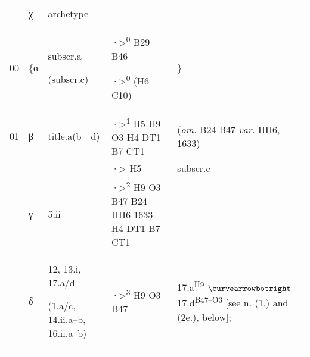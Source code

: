 \begin{paper}
\begin{center}
\begin{longtable}[]{@{}p{}p{}p{}p{}p{}@{}}
& χ & archetype & &\tabularnewline
\begin{minipage}[t]{0.17\columnwidth}\raggedright
00\strut
\end{minipage} & \begin{minipage}[t]{0.17\columnwidth}\raggedright
\{α\strut
\end{minipage} & \begin{minipage}[t]{0.17\columnwidth}\raggedright
subscr.a

(subscr.c)\strut
\end{minipage} & \begin{minipage}[t]{0.17\columnwidth}\raggedright
·\textgreater{}\textsuperscript{0} B29 B46

·\textgreater{}\textsuperscript{0} (H6 C10)\strut
\end{minipage} & \begin{minipage}[t]{0.17\columnwidth}\raggedright
\}\strut
\end{minipage}\tabularnewline
01 & β & title.a(b---d) & ·\textgreater{}\textsuperscript{1} H5 H9 O3 H4
DT1 B7 CT1 & (\emph{om.} B24 B47 \emph{var.} HH6, 1633)\tabularnewline
& & & \hfill·\textgreater{} H5 & subscr.c\tabularnewline\hline
& γ & 5.ii & ·\textgreater{}\textsuperscript{2} H9 O3 B47 B24 HH6 1633
H4 DT1 B7 CT1 &\tabularnewline\hline
\begin{minipage}[t]{0.17\columnwidth}\raggedright
\strut
\end{minipage} & \begin{minipage}[t]{0.17\columnwidth}\raggedright
δ\strut
\end{minipage} & \begin{minipage}[t]{0.17\columnwidth}\raggedright
12, 13.i, 17.a/d

(1.a/c, 14.ii.a--b, 16.ii.a--b)\strut
\end{minipage} & \begin{minipage}[t]{.4\columnwidth}\raggedright
·\textgreater{}\textsuperscript{3} H9 O3 B47\strut
\end{minipage} & \begin{minipage}[t]{.4\columnwidth}\raggedright
17.a\textsuperscript{H9} $\curvearrowbotright$ 17.d\textsuperscript{B47--O3} {[}see n. (1.)
and (2e.), below{]};


\end{minipage}
\end{longtable}
\end{center}
\end{paper}
